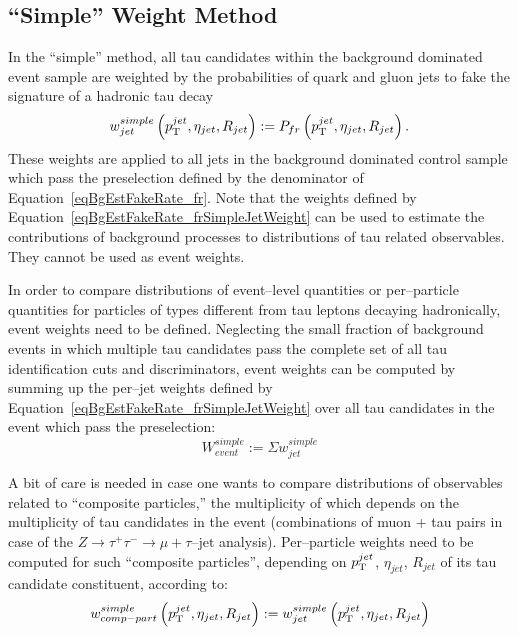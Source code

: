 \subsection{``Simple'' Weight Method}
%
In the ``simple'' method, all tau candidates within the background dominated
event sample are weighted by the probabilities of quark and gluon jets to fake
the signature of a hadronic tau decay
\begin{equation}
w_{jet}^{simple} \left( p_{\mathrm{T}}^{jet}, \eta_{jet}, R_{jet} \right) := P_{fr} \left(
p_{\mathrm{T}}^{jet}, \eta_{jet}, R_{jet} \right).
\label{eqBgEstFakeRate_frSimpleJetWeight}
\end{equation}
These weights are applied to all jets in the background dominated control sample
which pass the preselection defined by the denominator of
Equation~\ref{eqBgEstFakeRate_fr}.  Note that the weights defined by
Equation~\ref{eqBgEstFakeRate_frSimpleJetWeight} can be used to estimate the
contributions of background processes to distributions of tau related
observables.  They cannot be used as event weights.

In order to compare distributions of event--level quantities or per--particle
quantities for particles of types different from tau leptons decaying
hadronically, event weights need to be defined.  Neglecting the small fraction
of background events in which multiple tau candidates pass the complete set
of all tau identification cuts and discriminators, event weights can be computed
by summing up the per--jet weights defined by
Equation~\ref{eqBgEstFakeRate_frSimpleJetWeight} over all tau candidates in
the event which pass the preselection:
\begin{equation}
W_{event}^{simple} := \Sigma w_{jet}^{simple}
\label{eqBgEstFakeRate_frSimpleEventWeight}
\end{equation}

A bit of care is needed in case one wants to compare distributions of
observables related to ``composite particles,'' the multiplicity of which depends
on the multiplicity of tau candidates in the event (\eg combinations of
muon + tau pairs in case of the $Z \rightarrow \tau^{+} \tau^{-}
\rightarrow \mu + \tau\mbox{--jet}$ analysis).  Per--particle weights need to be
computed for such ``composite particles'', depending on $p_{\mathrm{T}}^{jet}$,
$\eta_{jet}$, $R_{jet}$ of its tau candidate constituent, according to:
\begin{equation}
w_{comp-part}^{simple} \left( p_{\mathrm{T}}^{jet}, \eta_{jet}, R_{jet} \right) := 
  w_{jet}^{simple} \left( p_{\mathrm{T}}^{jet}, \eta_{jet}, R_{jet} \right)
\label{eqBgEstFakeRate_frSimpleCompositeParticleWeight}
\end{equation}

